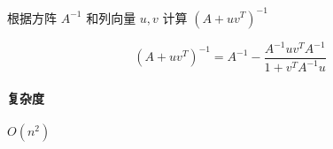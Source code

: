 根据方阵 \(A^{-1}\) 和列向量 \(u,v\) 计算 \((A+uv^T)^{-1}\)

\[
    \left(A+uv^T\right)^{-1}=A^{-1}-\frac{A^{-1}uv^TA^{-1}}{1+v^TA^{-1}u}
\]

\paragraph{复杂度} \(O(n^2)\)